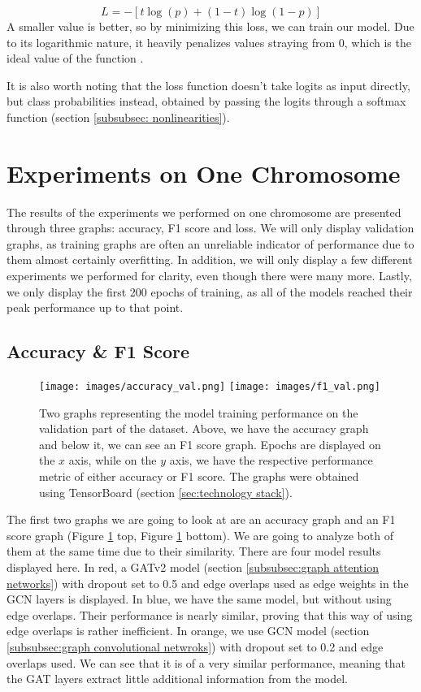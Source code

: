 \documentclass[times, utf8, diplomski, english]{fer_eng}
\begin{document}
\[ L = - [t \log (p) + (1 - t) \log (1 - p)] \]
A smaller value is better, so by minimizing this loss, we can train our model. Due to its logarithmic nature, it heavily penalizes values straying from 0, which is the ideal value of the function \cite{CEL}.

It is also worth noting that the loss function doesn't take logits as input directly, but class probabilities instead, obtained by passing the logits through a softmax function (section \ref{subsubsec: nonlinearities}).

\section{Experiments on One Chromosome}
\label{sec:experiments on one chromosome}

The results of the experiments we performed on one chromosome are presented through three graphs: accuracy, F1 score and loss. We will only display validation graphs, as training graphs are often an unreliable indicator of performance due to them almost certainly overfitting. In addition, we will only display a few different experiments we performed for clarity, even though there were many more. Lastly, we only display the first 200 epochs of training, as all of the models reached their peak performance up to that point.

\subsection{Accuracy \& F1 Score}

\begin{figure}[h]
	\centering
	\texttt{[image: images/accuracy\_val.png]}
	\texttt{[image: images/f1\_val.png]}
	\caption[Accuracy and f1 graph]{Two graphs representing the model training performance on the validation part of the dataset. Above, we have the accuracy graph and below it, we can see an F1 score graph. Epochs are displayed on the $x$ axis, while on the $y$ axis, we have the respective performance metric of either accuracy or F1 score. The graphs were obtained using TensorBoard (section \ref{sec:technology stack}).}
	\label{fig:accuracy and f1 graph}
\end{figure}

The first two graphs we are going to look at are an accuracy graph and an F1 score graph (Figure \ref{fig:accuracy and f1 graph} top, Figure \ref{fig:accuracy and f1 graph} bottom). We are going to analyze both of them at the same time due to their similarity. There are four model results displayed here. In red, a GATv2 model (section \ref{subsubsec:graph attention networks}) with dropout set to 0.5 and edge overlaps used as edge weights in the GCN layers is displayed. In blue, we have the same model, but without using edge overlaps. Their performance is nearly similar, proving that this way of using edge overlaps is rather inefficient. In orange, we use GCN model (section \ref{subsubsec:graph convolutional netwroks}) with dropout set to 0.2 and edge overlaps used. We can see that it is of a very similar performance, meaning that the GAT layers extract little additional information from the model.
\end{document}

